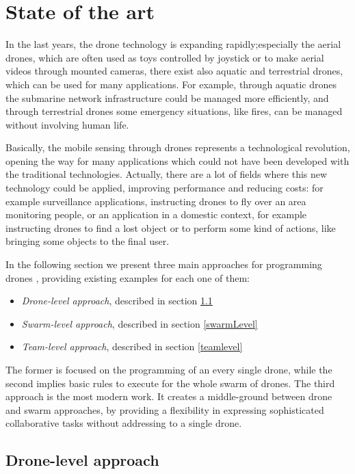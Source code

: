 \chapter{State of the art}
\label{cap2}

In the last years, the drone technology is expanding rapidly;especially the aerial drones, which are often used as toys controlled by joystick  or to make aerial videos through mounted cameras, there exist also aquatic and terrestrial drones, which can be used for many applications. 
For example, through aquatic drones the submarine network infrastructure could be managed more efficiently, and through terrestrial drones some emergency situations, like fires, can be managed without involving human life.

Basically, the mobile sensing through drones represents a technological revolution, opening the way for many applications which could not have been developed with the traditional technologies.
Actually, there are a lot of fields where this new technology could be applied, improving performance and reducing costs:
for example surveillance applications, instructing drones to fly over an area monitoring people, or an application in a domestic context, for example instructing drones to find a lost object or to perform some kind of actions, like bringing some objects to the final user.


In the following section we present three main approaches for programming drones , providing existing examples for each one of them:

\begin{itemize}
\itemsep2pt
\item{
\textit{Drone-level approach}, described in section \ref{droneLevel}
}
\item{
\textit{Swarm-level approach}, described in section \ref{swarmLevel}
}
\item{
\textit{Team-level approach}, described in section \ref{teamlevel}
}
\end{itemize}

The former is focused on the programming of an every single drone, while the second implies basic rules to execute for the whole swarm of drones. The third approach is the most modern work. It creates a middle-ground between drone and swarm approaches, by providing a flexibility in expressing sophisticated collaborative tasks without addressing to a single drone.

\newpage

\section {Drone-level approach}\label{droneLevel}

